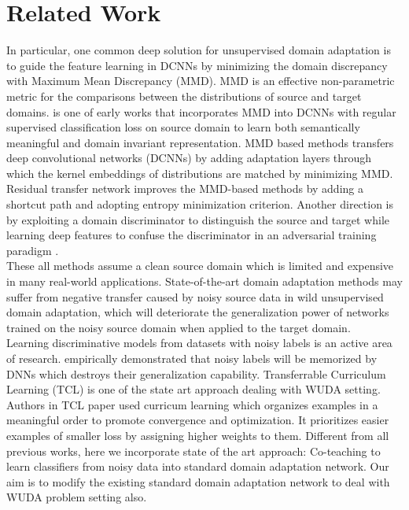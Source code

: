 \section{Related Work}
In particular, one common deep solution for unsupervised domain adaptation is to guide the feature learning in DCNNs by minimizing the domain discrepancy with Maximum Mean Discrepancy (MMD). MMD is an effective non-parametric metric for the comparisons between the distributions of source and target domains. \cite{mmd} is one of early works that incorporates MMD into DCNNs with regular supervised classification loss on source domain to learn both semantically meaningful and domain invariant representation. MMD based methods \cite{mmd,ltdan} transfers deep convolutional networks (DCNNs) by adding adaptation layers through which the kernel embeddings of distributions are matched by minimizing MMD. Residual transfer network \cite{rtn} improves the MMD-based methods by adding a shortcut path and adopting entropy minimization criterion. 
Another direction is by exploiting a domain discriminator to distinguish the source and target while learning deep features to confuse the discriminator in an adversarial training paradigm \cite{uda, dann, deeptransfer}.\\
These all methods assume a clean source domain which is limited and expensive in many real-world applications. State-of-the-art domain adaptation methods may suffer from negative transfer caused by noisy source data in wild unsupervised domain adaptation, which will deteriorate the generalization power of networks trained on the noisy source domain when applied to the target domain.\\
Learning discriminative models from datasets with noisy labels is an active area of research. \cite{DBLP:journals/corr/ZhangBHRV16} empirically demonstrated that noisy labels will be memorized by DNNs which destroys their generalization capability. Transferrable Curriculum Learning (TCL) \cite{tcl} is one of the state art approach dealing with WUDA setting. Authors in TCL paper used curricum learning \cite{curricumlearn_latent, curricumlearn} which organizes examples in a meaningful order to
promote convergence and optimization. It prioritizes easier examples of smaller loss by
assigning higher weights to them. Different from all previous works, here we incorporate state of the art approach: Co-teaching \cite{coteaching} to learn classifiers from noisy data into standard domain adaptation network. Our aim is to modify the existing standard domain adaptation network to deal with WUDA problem setting also. 